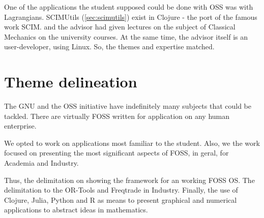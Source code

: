 \documentclass[
12pt,				%
openright,			%
oneside,			%
a4paper,			%
brazil,				%
english,			%
]{abntex2}
\begin{document}
One of the applications the student supposed could be done with OSS
was with Lagrangians. SCIMUtils (\autoref{sec:scimutils}) exist in
Clojure - the port of the famous work SCIM. and the advisor had given
lectures on the subject of Classical Mechanics on the university
courses. At the same time, the advisor itself is an user-developer,
using Linux. So, the themes and expertise matched.


\section{Theme delineation}
The GNU and the OSS initiative have indefinitely many subjects that
could be tackled. There are virtually FOSS written for application on
any human enterprise.   

We opted to work on applications most familiar to the student. Also,
we the work focused on presenting the most significant aspects of
FOSS, in geral, for Academia and Industry.

Thus, the delimitation on showing the framework for an working FOSS
OS. The delimitation to the OR-Tools and Freqtrade in
Industry. Finally, the use of Clojure, Julia, Python and R as means to
present graphical and numerical applications to abstract ideas in mathematics.
\end{document}
